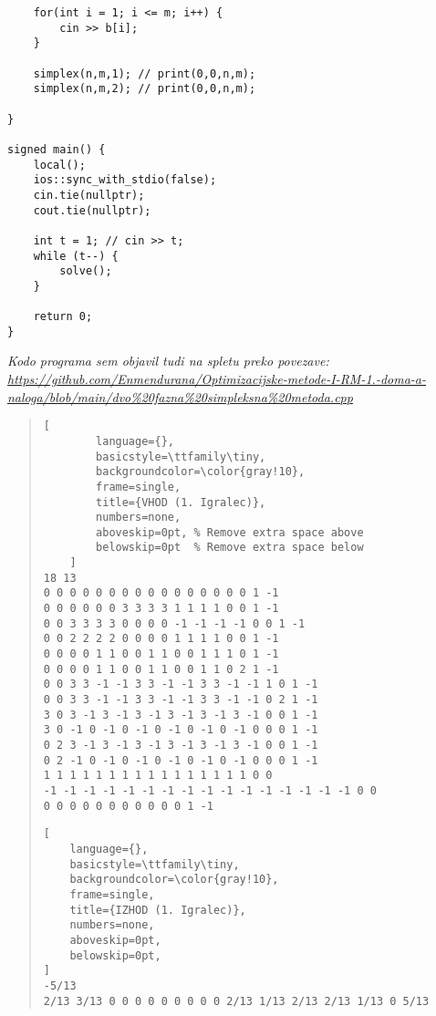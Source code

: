 \documentclass{article}
\begin{document}
\begin{enumerate}[label=\alph*)]
\begin{lstlisting}
    for(int i = 1; i <= m; i++) {
        cin >> b[i];
    }

    simplex(n,m,1); // print(0,0,n,m);
    simplex(n,m,2); // print(0,0,n,m);

}

signed main() {
    local();
    ios::sync_with_stdio(false);
    cin.tie(nullptr);
    cout.tie(nullptr);

    int t = 1; // cin >> t;
    while (t--) {
        solve();
    }

    return 0;
}
\end{lstlisting}
\centering
\textit{\small Kodo programa sem objavil tudi na spletu preko povezave: {\tiny \url{https://github.com/Enmendurana/Optimizacijske-metode-I-RM-1.-doma-a-naloga/blob/main/dvo\%20fazna\%20simpleksna\%20metoda.cpp}}}

\begin{quote}
    \begin{lstlisting}[
        language={}, 
        basicstyle=\ttfamily\tiny, 
        backgroundcolor=\color{gray!10}, 
        frame=single, 
        title={VHOD (1. Igralec)},
        numbers=none,
        aboveskip=0pt, % Remove extra space above
        belowskip=0pt  % Remove extra space below
    ]
18 13
0 0 0 0 0 0 0 0 0 0 0 0 0 0 0 0 1 -1
0 0 0 0 0 0 3 3 3 3 1 1 1 1 0 0 1 -1
0 0 3 3 3 3 0 0 0 0 -1 -1 -1 -1 0 0 1 -1
0 0 2 2 2 2 0 0 0 0 1 1 1 1 0 0 1 -1
0 0 0 0 1 1 0 0 1 1 0 0 1 1 1 0 1 -1
0 0 0 0 1 1 0 0 1 1 0 0 1 1 0 2 1 -1
0 0 3 3 -1 -1 3 3 -1 -1 3 3 -1 -1 1 0 1 -1
0 0 3 3 -1 -1 3 3 -1 -1 3 3 -1 -1 0 2 1 -1
3 0 3 -1 3 -1 3 -1 3 -1 3 -1 3 -1 0 0 1 -1
3 0 -1 0 -1 0 -1 0 -1 0 -1 0 -1 0 0 0 1 -1
0 2 3 -1 3 -1 3 -1 3 -1 3 -1 3 -1 0 0 1 -1
0 2 -1 0 -1 0 -1 0 -1 0 -1 0 -1 0 0 0 1 -1
1 1 1 1 1 1 1 1 1 1 1 1 1 1 1 1 0 0
-1 -1 -1 -1 -1 -1 -1 -1 -1 -1 -1 -1 -1 -1 -1 -1 0 0
0 0 0 0 0 0 0 0 0 0 0 1 -1
    \end{lstlisting}
    \begin{lstlisting}[
    language={}, 
    basicstyle=\ttfamily\tiny, 
    backgroundcolor=\color{gray!10}, 
    frame=single, 
    title={IZHOD (1. Igralec)},
    numbers=none,
    aboveskip=0pt,
    belowskip=0pt,
]
-5/13
2/13 3/13 0 0 0 0 0 0 0 0 0 2/13 1/13 2/13 2/13 1/13 0 5/13 
\end{lstlisting}
\end{quote}


\end{enumerate}
\end{document}
